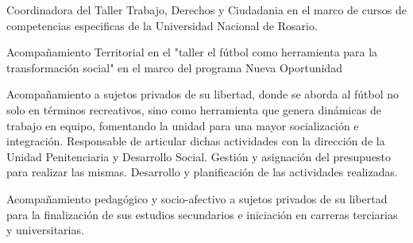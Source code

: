 \documentclass[11pt,a4paper,sans]{moderncv}        %
\begin{document}
  {
     Coordinadora del Taller Trabajo, Derechos y Ciudadania en el marco de cursos de competencias especificas de la Universidad Nacional de Rosario.
  }
\vspace{3mm}

  {
  }
\vspace{3mm}

  {
    Acompañamiento Territorial en el "taller el fútbol como herramienta para la transformación social" en el marco del programa Nueva Oportunidad
  }
\vspace{3mm}

  {
    Acompañamiento a sujetos privados de su libertad, donde se aborda al fútbol no solo en términos recreativos, sino como herramienta que genera dinámicas de trabajo en equipo, fomentando la unidad para una mayor socialización e integración.
    Responsable de articular dichas actividades con la dirección de la Unidad Penitenciaria y Desarrollo Social. Gestión y asignación del presupuesto para realizar las mismas. Desarrollo y planificación de las actividades realizadas.
  }
\vspace{3mm}

  {
    Acompañamiento pedagógico y socio-afectivo a sujetos privados de su libertad para la finalización de sus estudios secundarios e iniciación en carreras terciarias y universitarias.
  }
\vspace{3mm}

  {}
\vspace{3mm}
\end{document}
